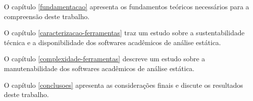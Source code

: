 O capítulo \ref{fundamentacao} apresenta os fundamentos teóricos necessários
para a compreensão deste trabalho.

O capítulo \ref{caracterizacao-ferramentas} traz um estudo sobre a
sustentabilidade técnica e a disponibilidade dos softwares acadêmicos de
análise estática.

O capítulo \ref{complexidade-ferramentas} descreve um estudo sobre a
manutenabilidade dos softwares acadêmicos de análise estática.

O capítulo \ref{conclusoes} apresenta as considerações finais e discute os
resultados deste trabalho.
